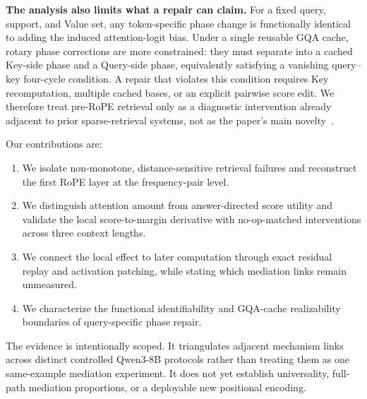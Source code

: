 \textbf{The analysis also limits what a repair can claim.}
For a fixed query, support, and Value set, any token-specific phase change is
functionally identical to adding the induced attention-logit bias.  Under a
single reusable GQA cache, rotary phase corrections are more constrained: they
must separate into a cached Key-side phase and a Query-side phase, equivalently
satisfying a vanishing query--key four-cycle condition.  A repair that violates
this condition requires Key recomputation, multiple cached bases, or an
explicit pairwise score edit.  We therefore treat pre-RoPE retrieval only as a
diagnostic intervention already adjacent to prior sparse-retrieval systems,
not as the paper's main novelty~\citep{mu2025sals,lu2024longheads,xiao2024infllm}.

Our contributions are:
\begin{enumerate}
  \item We isolate non-monotone, distance-sensitive retrieval failures and
  reconstruct the first RoPE layer at the frequency-pair level.
  \item We distinguish attention amount from answer-directed score utility and
  validate the local score-to-margin derivative with no-op-matched
  interventions across three context lengths.
  \item We connect the local effect to later computation through exact residual
  replay and activation patching, while stating which mediation links remain
  unmeasured.
  \item We characterize the functional identifiability and GQA-cache
  realizability boundaries of query-specific phase repair.
\end{enumerate}

The evidence is intentionally scoped.  It triangulates adjacent mechanism
links across distinct controlled Qwen3-8B protocols rather than treating them
as one same-example mediation experiment.  It does not yet establish
universality, full-path mediation proportions, or a deployable new positional
encoding.
